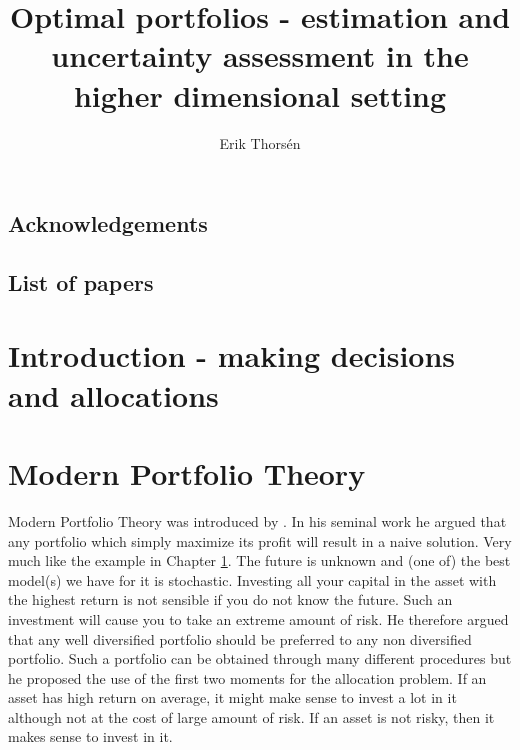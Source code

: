 \documentclass[]{book}\usepackage{knitr}
\title{Optimal portfolios - estimation and uncertainty assessment in the higher dimensional setting}
\author{Erik Thorsén}
\begin{document}


\maketitle

\section*{Acknowledgements}

\newpage
\section*{List of papers}



\tableofcontents
\chapter[Introduction]{Introduction - making decisions and allocations}\label{ch:intro}

\chapter{Modern Portfolio Theory}\label{ch:MPT}



Modern Portfolio Theory was introduced by \cite{markowitz1959portfolio}. 
In his seminal work he argued that any portfolio which simply maximize its profit will result in a naive solution.
Very much like the example in Chapter \ref{ch:intro}. 
The future is unknown and (one of) the best model(s) we have for it is stochastic.
Investing all your capital in the asset with the highest return is not sensible if you do not know the future.
Such an investment will cause you to take an extreme amount of risk. 
He therefore argued that any well diversified portfolio should be preferred to any non diversified portfolio. 
Such a portfolio can be obtained through many different procedures but he proposed the use of the first two moments for the allocation problem.
If an asset has high return on average, it might make sense to invest a lot in it although not at the cost of large amount of risk. If an asset is not risky, then it makes sense to invest in it.
\end{document}

